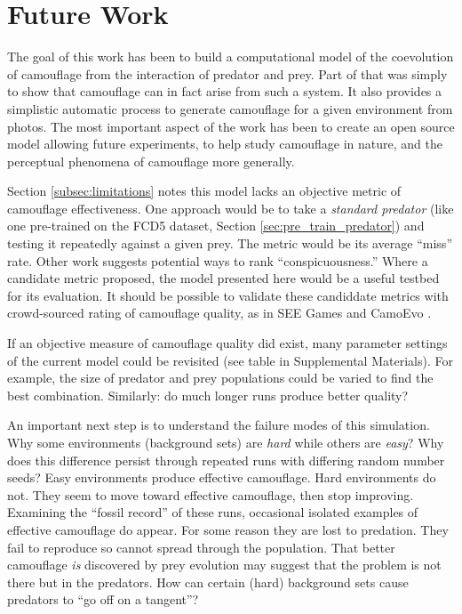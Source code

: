 \documentclass[acmtog]{acmart}
\newcommand{\jargon}[1]{\textit{#1}}
\begin{document}
\section{Future Work}
The goal of this work has been to build a computational model of the coevolution of camouflage from the interaction of predator and prey. Part of that was simply to show that camouflage can in fact arise from such a system. It also provides a simplistic automatic process to generate camouflage for a given environment from photos. The most important aspect of the work has been to create an open source model allowing future experiments, to help study camouflage in nature, and the perceptual phenomena of camouflage more generally.
\par
Section \ref{subsec:limitations} notes this model lacks an objective metric of camouflage effectiveness. One approach would be to take a \jargon{standard predator} (like one pre-trained on the FCD5 dataset, Section \ref{sec:pre_train_predator}) and testing it repeatedly against a given prey. The metric would be its average “miss” rate. Other work \cite{lv_cod_2022} suggests potential ways to rank “conspicuousness.” Where a candidate metric proposed, the model presented here would be a useful testbed for its evaluation. It should be possible to validate these candiddate metrics with crowd-sourced rating of camouflage quality, as in SEE Games \cite{stevens_games_2022} and CamoEvo \cite{hancock_camoevo_2022}.
\par
If an objective measure of camouflage quality did exist, many parameter settings of the current model could be revisited (see table in Supplemental Materials). For example, the size of predator and prey populations could be varied to find the best combination. Similarly: do much longer runs produce better quality?
\par
An important next step is to understand the failure modes of this simulation. Why some environments (background sets) are \textit{hard} while others are \textit{easy}? Why does this difference persist through repeated runs with differing random number seeds?
Easy environments produce effective camouflage. Hard environments do not. They seem to move toward effective camouflage, then stop improving. Examining the “fossil record” of these runs, occasional isolated examples of effective camouflage do appear. For some reason they are lost to predation. They fail to reproduce so cannot spread through the population. That better camouflage \textit{is} discovered by prey evolution may suggest that the problem is not there but in the predators. How can certain (hard) background sets cause predators to “go off on a tangent”?
\end{document}
